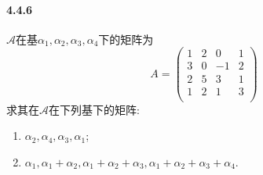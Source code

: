 \documentclass[11pt]{article}
\begin{document}
\paragraph{4.4.6}$\mathscr{A}$在基$\alpha_1,\alpha_2,\alpha_3,\alpha_4$下的矩阵为
$$A=\begin{pmatrix}
    1&2&0&1\\
    3&0&-1&2\\
    2&5&3&1\\
    1&2&1&3\\
\end{pmatrix}$$
求其在$\mathscr{A}$在下列基下的矩阵:
\begin{enumerate}
    \item $\alpha_2,\alpha_4,\alpha_3,\alpha_1$;
    \item $\alpha_1,\alpha_1+\alpha_2,\alpha_1+\alpha_2+\alpha_3,\alpha_1+\alpha_2+\alpha_3+\alpha_4$.
\end{enumerate}
\end{document}
